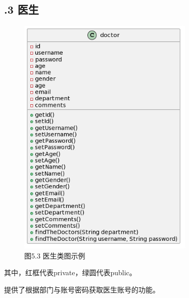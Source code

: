 \documentclass[24pt,a4paper]{article}%
\begin{document}
\subsection*{.3 医生}
\begin{figure}[H]
    \centering
    \includegraphics[width=0.75\textwidth]{images/doctor.png}
    \caption*{图5.3 医生类图示例}
\end{figure}
其中，红框代表private，绿圆代表public。\par
提供了根据部门与账号密码获取医生账号的功能。
\end{document}
